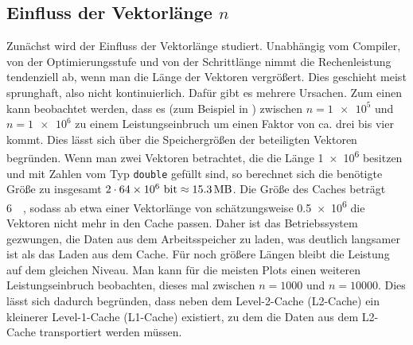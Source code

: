 \subsection{Einfluss der Vektorlänge $n$}
Zunächst wird der Einfluss der Vektorlänge studiert. Unabhängig vom Compiler, von
der Optimierungsstufe und von der Schrittlänge nimmt die Rechenleistung tendenziell
ab, wenn man die Länge der Vektoren vergrößert. Dies geschieht meist sprunghaft,
also nicht kontinuierlich. Dafür gibt es mehrere Ursachen. Zum einen kann beobachtet
werden, dass es (zum Beispiel in ) zwischen $n=\num{1e5}$ und
$n=\num{1e6}$ zu einem Leistungseinbruch um einen Faktor von ca. drei bis vier kommt.
Dies lässt sich über die Speichergrößen der beteiligten Vektoren begründen. Wenn 
man zwei Vektoren betrachtet, die die Länge \num{1e6} besitzen und mit Zahlen vom Typ
\texttt{double} gefüllt sind, so berechnet sich die benötigte Größe zu insgesamt
$2\cdot \num{64e6}\mbox{~bit}\approx \SI{15.3}{\mega\byte}$. Die Größe des Caches 
beträgt \SI{6}{\mega\byte}, sodass ab etwa einer Vektorlänge von schätzungsweise \num{0.5e6}     die 
Vektoren nicht mehr in den Cache passen. Daher ist das Betriebssystem gezwungen,
die Daten aus dem Arbeitsspeicher zu laden, was deutlich langsamer ist als das Laden
aus dem Cache. Für noch größere Längen bleibt die Leistung auf dem gleichen Niveau.
Man kann für die meisten Plots einen weiteren Leistungseinbruch beobachten, dieses
mal zwischen $n=1000$ und $n=10000$. Dies lässt sich dadurch begründen, dass neben
dem Level-2-Cache (L2-Cache) ein kleinerer Level-1-Cache (L1-Cache) existiert, zu
dem die Daten aus dem L2-Cache transportiert werden müssen.




% 
% 
% 
% 
% 
% 
% 
% 
% 
% 
% 
% 
% 
